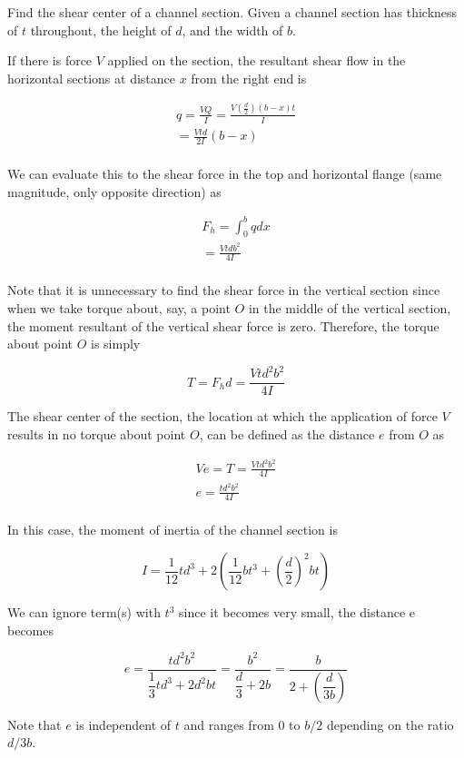 \documentclass[
10pt,
a4paper,
openany,
svgnames,
]{book} %
\begin{document}
\begin{example}
Find the shear center of a channel section. Given a channel section has thickness of $t$ throughout, the height of $d$, and the width of $b$.
\end{example}
\begin{solution}
If there is force $V$ applied on the section, the resultant shear flow in the horizontal sections at distance $x$ from the right end is

\[\begin{gathered}
  q = \frac{VQ}{I} = \frac{V\left( \frac{d}{2} \right)(b - x)t}{I} \\ 
   = \frac{Vtd}{2I}(b - x) \\ 
\end{gathered} \]	

We can evaluate this to the shear force in the top and horizontal flange (same magnitude, only opposite direction) as

\[\begin{gathered}
  F_h = \int_0^b qdx  \\ 
   = \frac{Vtdb^2}{4I} \\ 
\end{gathered} \]

Note that it is unnecessary to find the shear force in the vertical section since when we take torque about, say, a point $O$ in the middle of the vertical section, the moment resultant of the vertical shear force is zero. Therefore, the torque about point $O$ is simply

\[T = F_hd = \frac{Vtd^2b^2}{4I}\]

The shear center of the section, the location at which the application of force $V$ results in no torque about point $O$, can be defined as the distance $e$ from $O$ as

\[\begin{gathered}
  Ve = T = \frac{Vtd^2b^2}{4I} \\ 
  e = \frac{td^2b^2}{4I} \\ 
\end{gathered} \]

In this case, the moment of inertia of the channel section is

\[I = \frac{1}{12}td^3 + 2\left( \frac{1}{12}bt^3 + \left( \frac{d}{2} \right)^2bt \right)\]	

We can ignore term(s) with $t^3$ since it becomes very small, the distance e becomes

\[e = \frac{td^2b^2}{\dfrac{1}{3}t{d^3} + 2d^2bt} = \frac{b^2}{\dfrac{d}{3} + 2b} = \frac{b}{2 + \left( \dfrac{d}{3b} \right)}\]	

Note that $e$ is independent of $t$ and ranges from 0 to $b/2$ depending on the ratio $d/3b$.
\end{solution}
\end{document}
